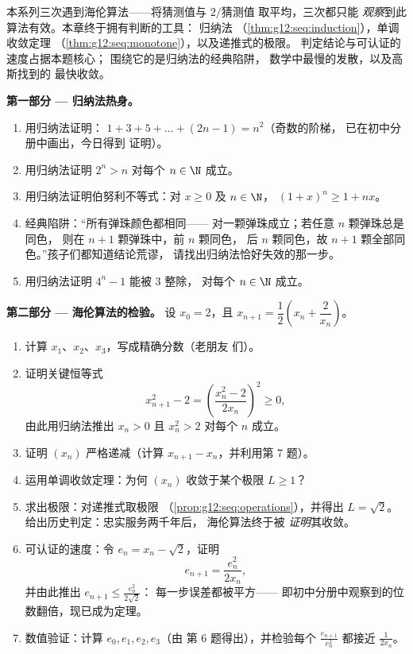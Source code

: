 \begin{problem}
\label{pb:g12:seq:1}
本系列三次遇到海伦算法——将猜测值与
$2/\text{猜测值}$ 取平均，三次都只能
\emph{观察}到此算法有效。本章终于拥有判断的工具：
归纳法
（\cref{thm:g12:seq:induction}），单调收敛定理
（\cref{thm:g12:seq:monotone}），以及递推式的极限。
判定结论与可认证的速度占据本题核心；
围绕它的是归纳法的经典陷阱，
数学中最慢的发散，以及高斯找到的
最快收敛。

\medskip
\noindent\textbf{第一部分 --- 归纳法热身。}
\begin{enumerate}
  \item 用归纳法证明：
        $1 + 3 + 5 + \dots + (2n - 1) = n^2$（奇数的阶梯，
        已在初中分册中画出，今日得到
        证明）。
  \item 用归纳法证明 $2^n > n$ 对每个
        $n \in \N$ 成立。
  \item 用归纳法证明伯努利不等式：对
        $x \geq 0$ 及 $n \in \N$，
        $(1 + x)^n \geq 1 + nx$。
  \item 经典陷阱：“所有弹珠颜色都相同——
        对一颗弹珠成立；若任意 $n$ 颗弹珠总是同色，
        则在 $n + 1$ 颗弹珠中，前 $n$ 颗同色，
        后 $n$ 颗同色，故
        $n + 1$ 颗全部同色。”孩子们都知道结论荒谬，
        请找出归纳法恰好失效的那一步。
  \item 用归纳法证明 $4^n - 1$ 能被 $3$ 整除，
        对每个 $n \in \N$ 成立。
\end{enumerate}

\medskip
\noindent\textbf{第二部分 --- 海伦算法的检验。}
设 $x_0 = 2$，且 $x_{n+1} = \dfrac12\left(x_n +
\dfrac{2}{x_n}\right)$。
\begin{enumerate}[resume]
  \item 计算 $x_1$、$x_2$、$x_3$，写成精确分数（老朋友
        们）。
  \item 证明关键恒等式
        \[
        x_{n+1}^2 - 2 = \left(\frac{x_n^2 - 2}{2x_n}\right)^{\!2}
        \geq 0,
        \]
        由此用归纳法推出 $x_n > 0$ 且
        $x_n^2 > 2$ 对每个 $n$ 成立。
  \item 证明 $(x_n)$ 严格递减（计算
        $x_{n+1} - x_n$，并利用第 7 题）。
  \item 运用单调收敛定理：为何
        $(x_n)$ 收敛于某个极限 $L \geq 1$？
  \item 求出极限：对递推式取极限
        （\cref{prop:g12:seq:operations}），并得出
        $L = \sqrt2$。给出历史判定：忠实服务两千年后，
        海伦算法终于被
        \emph{证明}其收敛。
  \item 可认证的速度：令 $e_n = x_n - \sqrt2$，证明
        \[
        e_{n+1} = \frac{e_n^2}{2 x_n} ,
        \]
        并由此推出 $e_{n+1} \leq \frac{e_n^2}{2\sqrt2}$：
        每一步误差都被平方——
        即初中分册中观察到的位数翻倍，现已成为定理。
  \item 数值验证：计算 $e_0, e_1, e_2, e_3$（由
        第 6 题得出），并检验每个 $\frac{e_{n+1}}{e_n^2}$
        都接近 $\frac{1}{2x_n}$。
\end{enumerate}


\end{problem}
